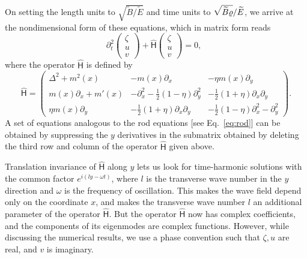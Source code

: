 On setting the length units to $\sqrt{\widetilde{B}/\widetilde{E}}$ and time units to $\sqrt{\smash[b]{\widetilde{B}\varrho}}/\widetilde{E}$, we arrive at the nondimensional form of these equations, which in matrix form reads
%
\begin{equation}
  \partial^{2}_{t}
  \begin{pmatrix}
    \zeta\\
    u\\
    v
  \end{pmatrix}
  +
  \widehat{\mathsf{H}}
  \begin{pmatrix}
    \zeta\\
    u\\
    v
  \end{pmatrix} = 0,\enspace
\end{equation}
%
where the operator $\widehat{\mathsf{H}}$ is defined by
%
\begin{equation}
  \widehat{\mathsf{H}} =
  \begin{pmatrix}
    \Delta^{2} + m^{2}(x) & -m(x)\partial_x & -\eta m(x) \partial_{y}\\
    m(x)\partial_{x} + m'(x) & -\partial_{x}^{2} - \frac{1}{2}(1-\eta)\partial^{2}_{y} & -\frac{1}{2}(1+\eta)\partial_{x}\partial_{y}\\
    \eta m(x)\partial_{y} & -\frac{1}{2}(1+\eta)\partial_{x}\partial_{y} & -\frac{1}{2}(1-\eta)\partial_{x}^{2} - \partial_{y}^{2}
  \end{pmatrix}.
  \label{eq:shell_wave_eq}
\end{equation}
%
A set of equations analogous to the rod equations [see Eq.~\eqref{eq:rod}] can be obtained by suppressing the $y$ derivatives in the submatrix obtained by deleting the third row and column of the operator $\widehat{\mathsf{H}}$ given above.

Translation invariance of $\widehat{\mathsf{H}}$ along $y$ lets us look for time-harmonic solutions with the common factor $e^{i(ly - \omega t)}$, where $l$ is the transverse wave number in the $y$ direction and $\omega$ is the frequency of oscillation.
This makes the wave field depend only on the coordinate $x$, and makes the transverse wave number $l$ an additional parameter of the operator $\widehat{\mathsf{H}}$.
But the operator $\widehat{\mathsf{H}}$ now has complex coefficients, and the components of its eigenmodes are complex functions.
However, while discussing the numerical results, we use a phase convention such that $\zeta, u$ are real, and $v$ is imaginary.

